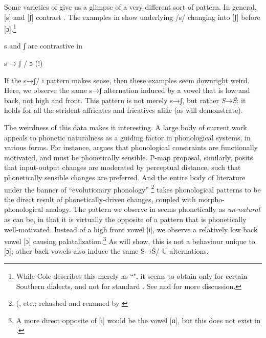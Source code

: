 \documentclass[output=paper,newtxmath,modfonts,nonflat,hidelinks]{langsci/langscibook}
\begin{document}
Some varieties of  give us a glimpse of a very different sort of pattern. In general, [s] and [ʃ] contrast . The examples in  \citep[from][]{Cole1955} show underlying /s/ changing into [ʃ] before [ɔ].\footnote{While Cole describes this merely as ``", it seems to obtain only for certain Southern dialects, and not for standard . See  and  for more discussion.}

\ea\label{ex:bennett:1}
s and ʃ are contrastive in  \citep[25]{Cole1955}\\
\z

\ea\label{ex:bennett:2}
s → ʃ / {\longrule} ɔ (!)
\ea\label{ex:bennett:2a}
\ex\label{ex:bennett:2b} 
\ex\label{ex:bennett:2c} 
\z
\z

If the s→ʃ/ {\longrule} i pattern makes sense, then these examples seem downright weird. Here, we observe the same s→ʃ alternation induced by a vowel that is low and back, not high and front. This pattern is not merely s→ʃ, but rather \textit{S}→\textit{Š}: it holds for all the strident affricates and fricatives alike (as  will demonstrate).

The weirdness of this data makes it interesting. A large body of current work appeals to phonetic naturalness as a guiding factor in phonological systems, in various forms. For instance, \citet{Hayes1999} argues that phonological constraints are functionally motivated, and must be phonetically sensible.  P-map proposal, similarly, posits that input-output changes are moderated by perceptual distance, such that phonetically sensible changes are preferred. And the entire body of literature under the banner of ``evolutionary phonology''%
\footnote{(\citet{Ohala1981,Ohala1990,Ohala:2004aa}, etc.; rehashed and renamed by \citet{Blevins2004}} takes phonological patterns to be the direct result of phonetically-driven changes, coupled with morpho-phonological analogy. The pattern we observe in  seems phonetically as \textit{un-natural} as can be, in that it is virtually the opposite of a pattern that is phonetically well-motivated. Instead of a high front vowel [i], we observe a relatively low back vowel [ɔ] causing palatalization.\footnote{A more direct opposite of [i] would be the vowel [ɑ], but this does not exist in .} As  will show, this is not a behaviour unique to [ɔ]; other back vowels also induce the same S→Š/ {\longrule} U alternations.
\end{document}
